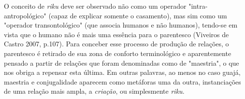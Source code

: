O conceito de \emph{riku} deve ser observado não como um operador
"intra-antropológico" (capaz de explicar somente o casamento), mas sim
como um "operador transontológico" (que associa humanos e não humanos),
tendo-se em vista que o humano não é mais uma essência para o parentesco
(Viveiros de Castro 2007, p.107). Para conceber esse processo de
produção de relações, o parentesco é retirado de sua zona de conforto
terminológico e aparentemente pensado a partir de relações que foram
denominadas como de "maestria", o que nos obriga a repensar esta última.
Em outras palavras, ao menos no caso guajá, maestria e conjugalidade
aparecem como metáforas uma da outra, instanciações de uma relação mais
ampla, a \emph{criação}, ou simplesmente \emph{riku}.
